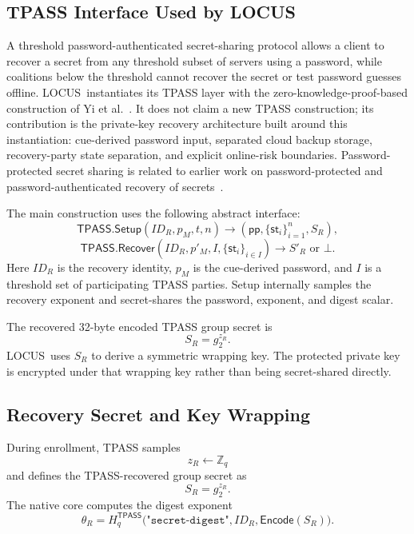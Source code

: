 \documentclass[sigconf,anonymous]{acmart}
\newcounter{protocol}
\newcommand{\LOCUS}{\textsf{LOCUS}}
\newcommand{\Encode}{\mathsf{Encode}}
\newcommand{\TPASS}{\mathsf{TPASS}}
\begin{document}
\subsection{TPASS Interface Used by LOCUS}
\label{subsec:tpass-interface}

A threshold password-authenticated secret-sharing protocol allows a client to recover a secret from any threshold subset of servers using a password, while coalitions below the threshold cannot recover the secret or test password guesses offline. \LOCUS\ instantiates its TPASS layer with the zero-knowledge-proof-based construction of Yi et al.~\cite{Yi2015TPASS,Yi2019TPASS}. It does not claim a new TPASS construction; its contribution is the private-key recovery architecture built around this instantiation: cue-derived password input, separated cloud backup storage, recovery-party state separation, and explicit online-risk boundaries. Password-protected secret sharing is related to earlier work on password-protected and password-authenticated recovery of secrets~\cite{Bagherzandi2011PPSS,Camenisch2014Memento}.

The main construction uses the following abstract interface:
\[
\TPASS.\mathsf{Setup}(ID_R,p_M,t,n)
\rightarrow
(\mathsf{pp},\{\mathsf{st}_i\}_{i=1}^{n},S_R),
\]
\[
\TPASS.\mathsf{Recover}(ID_R,p'_M,I,\{\mathsf{st}_i\}_{i\in I})
\rightarrow
S'_R \text{ or } \bot .
\]
Here \(ID_R\) is the recovery identity, \(p_M\) is the cue-derived password, and \(I\) is a threshold set of participating TPASS parties. Setup internally samples the recovery exponent and secret-shares the password, exponent, and digest scalar.

The recovered 32-byte encoded TPASS group secret is
\[
S_R=g_2^{z_R}.
\]
\LOCUS\ uses \(S_R\) to derive a symmetric wrapping key. The protected private key is encrypted under that wrapping key rather than being secret-shared directly.

\subsection{Recovery Secret and Key Wrapping}

During enrollment, TPASS samples
\[
z_R\leftarrow\mathbb{Z}_q
\]
and defines the TPASS-recovered group secret as
\[
S_R=g_2^{z_R}.
\]
The native core computes the digest exponent
\begin{equation}
\theta_R =
H_q^{\mathsf{TPASS}}
\big(\texttt{"secret-digest"},ID_R,\Encode(S_R)\big).
\label{eq:digest-exponent}
\end{equation}
\end{document}
